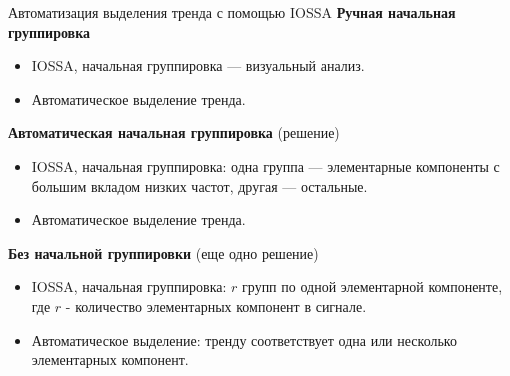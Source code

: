 \documentclass[ucs, notheorems, handout]{beamer}
\begin{document}
\begin{frame}{Автоматизация выделения тренда с помощью IOSSA}
    \textbf{Ручная начальная группировка}
        \footnotesize
        \begin{itemize}
            \item IOSSA, начальная группировка --- визуальный анализ.
            \item Автоматическое выделение тренда.
        \end{itemize}
        \pause
        \normalsize
    \textbf{Автоматическая начальная группировка} (решение)
        \footnotesize
        \begin{itemize}
            \item IOSSA, начальная группировка: одна группа --- элементарные компоненты с большим вкладом низких частот, другая --- остальные.
            \item Автоматическое выделение тренда.
        \end{itemize}
        \pause
        \normalsize
    \textbf{Без начальной группировки} (еще одно решение)
        \footnotesize
        \begin{itemize}
            \item IOSSA, начальная группировка:  $r$ групп по одной элементарной компоненте, где $r$ - количество элементарных компонент в сигнале.
            \item Автоматическое выделение: тренду соответствует одна или несколько элементарных компонент.
        \end{itemize}
\end{frame}
\end{document}

